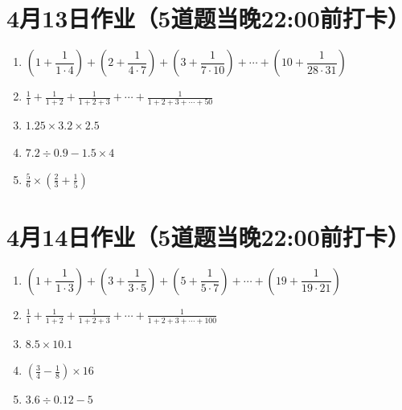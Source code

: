 \documentclass[UTF8,12pt,a4paper]{ctexart}
\newcommand{\BottomWriteSpace}{1.8cm}
\newenvironment{OnePageFiveFill}{
  \small
  \vspace*{0pt}
  \begin{enumerate}[leftmargin=*, itemsep=0pt, topsep=0pt, parsep=0pt, partopsep=0pt]
  \setlength{\parskip}{0pt}
}{
  \end{enumerate}
  \vspace*{\BottomWriteSpace}
  \normalsize
  \newpage
}
\newcommand{\Q}[1]{\item #1\par\vfill}
\newcommand{\Qlast}[1]{\item #1\par}
\begin{document}
\section*{4月13日作业（5道题当晚22:00前打卡）}
\begin{OnePageFiveFill}

\Q{$\left(1+\dfrac{1}{1\cdot4}\right) + \left(2+\dfrac{1}{4\cdot7}\right) + \left(3+\dfrac{1}{7\cdot10}\right) + \cdots + \left(10+\dfrac{1}{28\cdot31}\right)$}

\Q{$\displaystyle \frac{1}{1}+\frac{1}{1+2}+\frac{1}{1+2+3}+\cdots+\frac{1}{1+2+3+\cdots+50}$}

\Q{$1.25 \times 3.2 \times 2.5$}

\Q{$7.2 \div 0.9 - 1.5 \times 4$}

\Qlast{$\displaystyle \frac{5}{6} \times \left( \frac{2}{3} + \frac{1}{5} \right)$}

\end{OnePageFiveFill}

\section*{4月14日作业（5道题当晚22:00前打卡）}
\begin{OnePageFiveFill}

\Q{$\left(1+\dfrac{1}{1\cdot3}\right) + \left(3+\dfrac{1}{3\cdot5}\right) + \left(5+\dfrac{1}{5\cdot7}\right) + \cdots + \left(19+\dfrac{1}{19\cdot21}\right)$}

\Q{$\displaystyle \frac{1}{1}+\frac{1}{1+2}+\frac{1}{1+2+3}+\cdots+\frac{1}{1+2+3+\cdots+100}$}

\Q{$8.5 \times 10.1$}

\Q{$\displaystyle \left(\frac{3}{4} - \frac{1}{8}\right) \times 16$}

\Qlast{$3.6 \div 0.12 - 5$}

\end{OnePageFiveFill}

\end{document}
